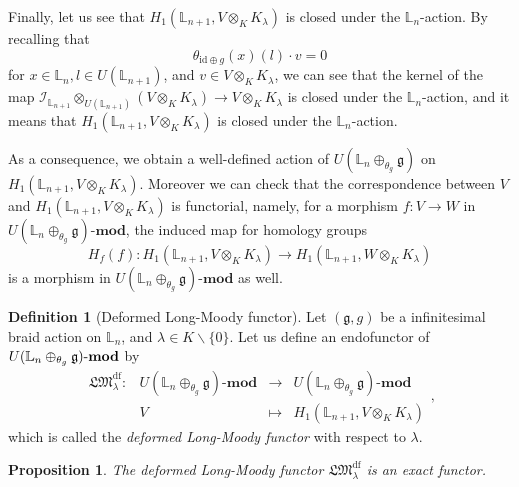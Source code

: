 \documentclass[a4paper,12pt]{article}
\newtheorem{prop}[thm]{Proposition}
\theoremstyle{definition}
\newtheorem{df}[thm]{Definition}
\theoremstyle{remark}
\begin{document}
Finally, let us see that $H_1(\mathbb{L}_{n+1}, V\otimes_{K} K_{\lambda})$ is closed under the $\mathbb{L}_{n}$-action.
By recalling that 
\[
	\theta_{\mathrm{id}\oplus g}(x)(l)\cdot v=0
\]
for $x\in \mathbb{L}_{n}, l\in U(\mathbb{L}_{n+1})$, and $v\in V\otimes_{K}K_{\lambda}$, we can see that 
the kernel of the map
$\mathcal{I}_{\mathbb{L}_{n+1}}\otimes_{U(\mathbb{L}_{n+1})} (V\otimes_{K} K_{\lambda})\rightarrow V\otimes_{K} K_{\lambda}$
is closed under the $\mathbb{L}_{n}$-action, and it means that  $H_1(\mathbb{L}_{n+1}, V\otimes_{K} K_{\lambda})$ is closed under the $\mathbb{L}_{n}$-action.

As a consequence, we obtain a well-defined action of 
$U(\mathbb{L}_{n}\oplus_{\theta_{g}}\mathfrak{g})$ 
 on $H_1(\mathbb{L}_{n+1}, V\otimes_{K} K_{\lambda})$.
 Moreover we can check that the correspondence between $V$ and $H_1(\mathbb{L}_{n+1}, V\otimes_{K} K_{\lambda})$
 is functorial, namely, 
for a morphism $f\colon V\to W$ in $U(\mathbb{L}_{n}\oplus_{\theta_{g}} \mathfrak{g})\text{-}\mathbf{mod}$, 
the induced map for homology groups
\[
	H_{f}(f)\colon H_{1}(\mathbb{L}_{n+1}, V\otimes_{K} K_{\lambda})\to H_{1}(\mathbb{L}_{n+1}, W\otimes_{K} K_{\lambda})
\]	
is a morphism in $U(\mathbb{L}_{n}\oplus_{\theta_{g}} \mathfrak{g})\text{-}\mathbf{mod}$ as well. 
\begin{df}[Deformed Long-Moody functor]
	Let $(\mathfrak{g},g)$ be a infinitesimal braid action on $\mathbb{L}_{n}$,
	and $\lambda\in K\backslash\{0\}$.
	Let us define an endofunctor of $U(\mathbb{L}_{n}\oplus_{\theta_{g}} \mathfrak{g})\text{-\textbf{mod}}$ 
	by 
	\[
		\begin{array}{cccc}
			\mathfrak{LM}^{\mathrm{df}}_{\lambda}\colon & U(\mathbb{L}_{n}\oplus_{\theta_{g}} \mathfrak{g})\text{-}\mathbf{mod} & \to & U(\mathbb{L}_{n}\oplus_{\theta_{g}} \mathfrak{g})\text{-}\mathbf{mod}\\
			& V & \mapsto & H_1(\mathbb{L}_{n+1}, V\otimes_{K} K_{\lambda})
		\end{array},
	\]
	which is called the \emph{deformed Long-Moody functor} with respect to $\lambda$.
\end{df}
\begin{prop}\label{prop:exact}
The deformed Long-Moody functor $\mathfrak{LM}^{\mathrm{df}}_{\lambda}$ is an exact functor.
\end{prop}
\end{document}
